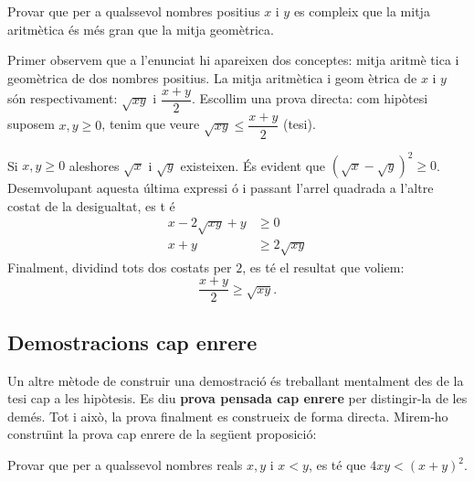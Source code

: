 \begin{exemple}
Provar que per a qualssevol nombres positius $x$ i $y$ es compleix que la
mitja aritm\`{e}tica \'{e}s m\'{e}s gran que la mitja geom\`{e}trica.
\end{exemple}

\begin{solucio}
Primer observem que a l'enunciat hi apareixen dos conceptes: mitja aritm\`{e}%
tica i geom\`{e}trica de dos nombres positius. La mitja aritm\`{e}tica i geom%
\`{e}trica de $x$ i $y$ s\'{o}n respectivament: $\sqrt{xy}$ i $\dfrac{x+y}{2}
$. Escollim una prova directa: com hip\`{o}tesi suposem $x,y\geq0$, tenim
que veure $\sqrt{xy}\leq\dfrac{x+y}{2}$ (tesi).

Si $x,y\geq0$ aleshores $\sqrt{x}$ i $\sqrt{y}$ existeixen. \'{E}s evident
que $(\sqrt{x}-\sqrt{y})^{2}\geq0$. Desemvolupant aquesta \'{u}ltima expressi%
\'{o} i passant l'arrel quadrada a l'altre costat de la desigualtat, es t%
\'{e}%
\begin{align*}
x-2\sqrt{xy}+y & \geq0 \\
x+y & \geq2\sqrt{xy}
\end{align*}
Finalment, dividind tots dos costats per $2$, es t\'{e} el resultat que
voliem:%
\begin{equation*}
\frac{x+y}{2}\geq\sqrt{xy}\text{.}
\end{equation*}
\end{solucio}

\subsection{Demostracions cap enrere}

Un altre m\`{e}tode de construir una demostraci\'{o} \'{e}s treballant
mentalment des de la tesi cap a les hip\`{o}tesis. Es diu \textbf{prova
pensada cap enrere} per distingir-la de les dem\'{e}s. Tot i aix\`{o}, la
prova finalment es construeix de forma directa. Mirem-ho constru\"{\i}nt la
prova cap enrere de la seg\"{u}ent proposici\'{o}:

\begin{exemple}
Provar que per a qualssevol nombres reals $x,y$ i $x<y$, es t\'{e} que $%
4xy<(x+y)^{2}$.
\end{exemple}

